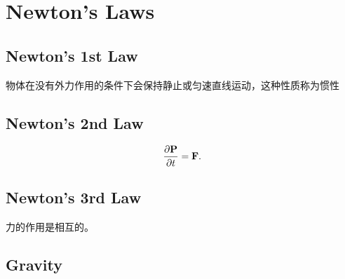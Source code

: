 \chapter{Newton's Laws}

\section{Newton's 1st Law}
物体在没有外力作用的条件下会保持静止或匀速直线运动，这种性质称为惯性

\section{Newton's 2nd Law}
\begin{equation}
    \frac{\partial \mathbf{P}}{\partial t}=\mathbf{F}.
\end{equation}
\section{Newton's 3rd Law}
力的作用是相互的。
\section{Gravity}